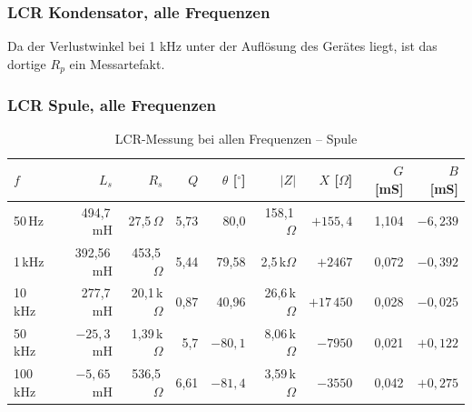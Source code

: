 \documentclass{article}
\begin{document}
\subsubsection{LCR Kondensator, alle Frequenzen}
\begin{table}[H]
\centering
\caption{LCR-Messung bei allen Frequenzen -- Kondensator}
\label{tab:lcr_kond}
\end{table}

Da der Verlustwinkel bei 1 kHz unter der Auflösung des Gerätes liegt, ist das dortige $R_p$ ein Messartefakt.

\subsubsection{LCR Spule, alle Frequenzen}
\begin{table}[H]
\centering
\caption{LCR-Messung bei allen Frequenzen -- Spule}
\label{tab:lcr_spule}
\begin{tabular}{|l|r|r|r|r|r|r|r|r|}
\hline
$f$ & $L_s$ & $R_s$ & $Q$ & $\theta$ [$^\circ$] & $|Z|$ & $X$ [$\Omega$] & $G$ [mS] & $B$ [mS] \\
\hline
50\,Hz   & 494,7\,mH  & 27,5\,$\Omega$   & 5,73 & 80,0    & 158,1\,$\Omega$   & $+155,4$  & 1,104 & $-6,239$ \\ \hline
1\,kHz   & 392,56\,mH & 453,5\,$\Omega$  & 5,44 & 79,58   & 2,5\,k$\Omega$    & $+2467$   & 0,072 & $-0,392$ \\ \hline
10\,kHz  & 277,7\,mH  & 20,1\,k$\Omega$  & 0,87 & 40,96   & 26,6\,k$\Omega$   & $+17\,450$ & 0,028 & $-0,025$ \\ \hline
50\,kHz  & $-25,3$\,mH & 1,39\,k$\Omega$ & 5,7  & $-80,1$ & 8,06\,k$\Omega$   & $-7950$   & 0,021 & $+0,122$ \\ \hline
100\,kHz & $-5,65$\,mH & 536,5\,$\Omega$ & 6,61 & $-81,4$ & 3,59\,k$\Omega$   & $-3550$   & 0,042 & $+0,275$ \\
\hline
\end{tabular}
\end{table}
\end{document}
